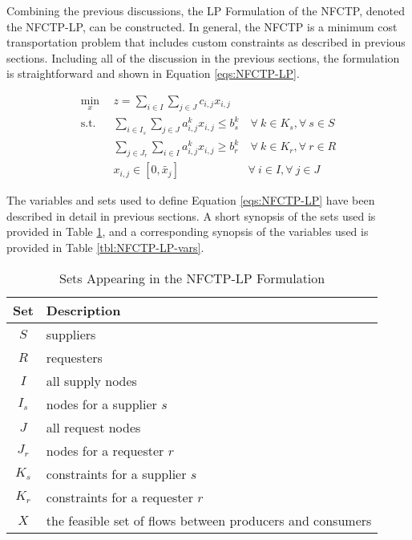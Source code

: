 Combining the previous discussions, the LP Formulation of the NFCTP, denoted the
NFCTP-LP, can be constructed. In general, the NFCTP is a minimum cost
transportation problem that includes custom constraints as described in previous
sections. Including all of the discussion in the previous sections, the
formulation is straightforward and shown in Equation \ref{eqs:NFCTP-LP}.

\begin{subequations}\label{eqs:NFCTP-LP}
  \begin{align}
    \min_{x} \:\: 
    & 
    z = \sum_{i \in I}\sum_{j \in J}c_{i,j} x_{i,j} 
    & 
    \label{eqs:NFCTP-LP_obj} \\
    \text{s.t.} \:\: 
    &
    \sum_{i \in I_s} \sum_{j \in J} a^k_{i,j} x_{i,j} \leq b^k_s 
    &
    \: 
    \forall \: k \in K_s, 
    \forall \: s \in S 
    \label{eqs:NFCTP-LP_sup} \\
    &
    \sum_{j \in J_r} \sum_{i \in I} a^k_{i,j} x_{i,j} \geq b^k_r 
    &
    \: 
    \forall \: k \in K_r,  
    \forall \: r \in R 
    \label{eqs:NFCTP-LP_req} \\
    &
    x_{i,j} \in [0, \tilde{x_j}]
    &
    \forall \: i \in I, 
    \forall \: j \in J 
    \label{eqs:NFCTP-LP_x}
  \end{align}
\end{subequations}

The variables and sets used to define Equation \ref{eqs:NFCTP-LP} have been
described in detail in previous sections. A short synopsis of the sets used is
provided in Table \ref{tbl:NFCTP-LP-sets}, and a corresponding synopsis of the
variables used is provided in Table \ref{tbl:NFCTP-LP-vars}.

\begin{table} [h!]
\centering
\begin{tabularx}{\columnwidth-10pt}{|c|X|} %
\hline
Set         & Description \\
\hline
$S$     & suppliers \\
$R$     & requesters \\
$I$     & all supply nodes \\
$I_s$   & nodes for a supplier $s$ \\
$J$     & all request nodes \\
$J_r$   & nodes for a requester $r$ \\
$K_s$   & constraints for a supplier $s$ \\
$K_r$   & constraints for a requester $r$ \\
$X$         & the feasible set of flows between producers and consumers  \\
\hline
\end{tabularx}
\caption{Sets Appearing in the NFCTP-LP Formulation}
\label{tbl:NFCTP-LP-sets}
\end{table}

